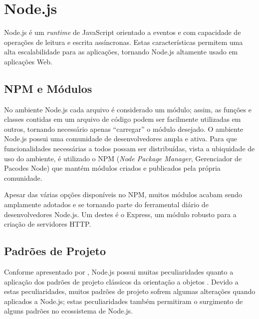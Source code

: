 
\section{Node.js}
\label{tec:node}

Node.js é um \textit{runtime} de JavaScript orientado a eventos \cite{NODEORG:2009} e com capacidade de operações de leitura e escrita assíncronas. Estas características permitem uma alta escalabilidade para as aplicações, tornando Node.js altamente usado em aplicações Web.


\subsection{NPM e Módulos}
\label{node:mod}

No ambiente Node.js cada arquivo é considerado um módulo; assim, as funções e classes contidas em um arquivo de código podem ser facilmente utilizadas em outros, tornando necessário apenas ``carregar'' o módulo desejado. O ambiente Node.js possui uma comunidade de desenvolvedores ampla e ativa. Para que funcionalidades necessárias a todos possam ser distribuídas, vista a ubiquidade de uso do ambiente, é utilizado o NPM (\textit{Node Package Manager}, Gerenciador de Pacodes Node) que mantém módulos criados e publicados pela própria comunidade.

Apesar das várias opções disponíveis no NPM, muitos módulos acabam sendo amplamente adotados e se tornando parte do ferramental diário de desenvolvedores Node.js. Um destes é o Express, um módulo robusto para a criação de servidores HTTP.


\subsection{Padrões de Projeto}
\label{node:design}

Conforme apresentado por , Node.js possui muitas peculiaridades quanto a aplicação dos padrões de projeto clássicos da orientação a objetos \cite{GAMMA:1995}. Devido a estas peculiaridades, muitos padrões de projeto sofrem algumas alterações quando aplicados a Node.js; estas peculiaridades também permitiram o surgimento de alguns padrões no ecossistema de Node.js.

